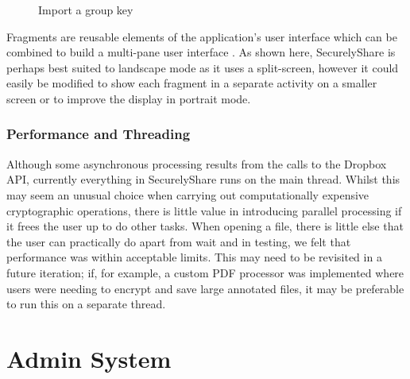 \begin{figure}[h!]
                                                                                                                                                                                                           
    \caption{Import a group key }
    \label{fig:import}
\end{figure}

Fragments are reusable elements of the application's user interface which can be combined to build a multi-pane user interface \cite{androiddev3}. As shown here, SecurelyShare is perhaps  best suited to landscape mode as it uses a split-screen, however it could easily be modified to show each fragment in a separate activity on a smaller screen or to improve the display in portrait mode.

\subsubsection*{Performance and Threading}
Although some asynchronous processing results from the calls to the Dropbox API, currently everything in SecurelyShare runs on the main thread.  Whilst this may seem an unusual choice when carrying out computationally expensive cryptographic operations, there is little value in introducing parallel processing if it frees the user up to do other tasks.  When opening a file, there is little else that the user can practically do apart from wait and in testing, we felt that performance was within acceptable limits.  This may need to be revisited in a future iteration;  if, for example, a custom PDF processor was implemented where users were needing to encrypt and save large annotated files, it may be preferable to run this on a separate thread.

\section{Admin System}
\\

